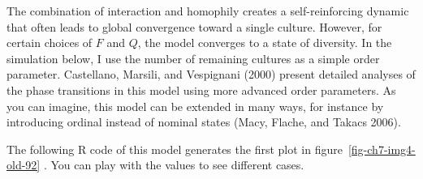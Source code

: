 \documentclass[
  a4paper,
  DIV=11,
  numbers=noendperiod,
  oneside]{scrreprt}
\begin{document}
The combination of interaction and homophily creates a self-reinforcing
dynamic that often leads to global convergence toward a single culture.
However, for certain choices of \(F\) and \(Q\), the model converges to
a state of diversity. In the simulation below, I use the number of
remaining cultures as a simple order parameter. Castellano, Marsili, and
Vespignani (2000) present detailed analyses of the phase transitions in
this model using more advanced order parameters. As you can imagine,
this model can be extended in many ways, for instance by introducing
ordinal instead of nominal states (Macy, Flache, and Takacs 2006).

The following R code of this model generates the first plot in
figure~\ref{fig-ch7-img4-old-92} . You can play with the values to see
different cases.
\end{document}
